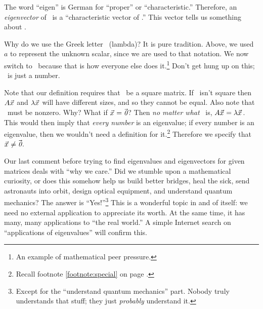
The word ``eigen'' is German for ``proper'' or ``characteristic.'' Therefore, an \textit{eigenvector} of \tta\ is a ``characteristic vector of \tta.'' This vector tells us something about \tta. 

Why do we use the Greek letter \lda\ (lambda)? It is pure tradition. Above, we used $a$ to represent the unknown scalar, since we are used to that notation. We now switch to \lda\ because that is how everyone else does it.\footnote{An example of mathematical peer pressure.} %
 Don't get hung up on this; \lda\ is just a number.

Note that our definition requires that \tta\ be a square matrix.
If \tta\ isn't square then $A\vec{x_{}}$ and $\lambda\vec{x_{}}$ will have different sizes, and so they cannot be equal. Also note that \vx\ must be nonzero. Why? What if $\vec{x_{}} = \vec{\text{\it 0}}$? Then \textit{no matter what} \lda\ is, $A\vec{x_{}} = \lambda\vec{x_{}}$. This would then imply that \textit{every number} is an eigenvalue; if every number is an eigenvalue, then we wouldn't need a definition for 
it.\footnote{Recall footnote \ref{footnote:special} on page \pageref{footnote:special}.} Therefore we specify that $\vec{x_{}}\neq \vec{\text{\it 0}}$.

Our last comment before trying to find eigenvalues and eigenvectors for given matrices deals with ``why we care.'' Did we stumble upon a mathematical curiosity, or does this somehow help us build better bridges, heal the sick, send astronauts into orbit, design optical equipment, and understand quantum mechanics? The answer is ``Yes!''\footnote{Except for the ``understand quantum mechanics'' part. Nobody truly understands that stuff; they just \textit{probably} understand it.} This is a wonderful topic in and of itself: we need no external application to appreciate its worth. At the same time, it has many, many applications to ``the real world.'' A simple Internet search on ``applications of eigenvalues'' will confirm this.

